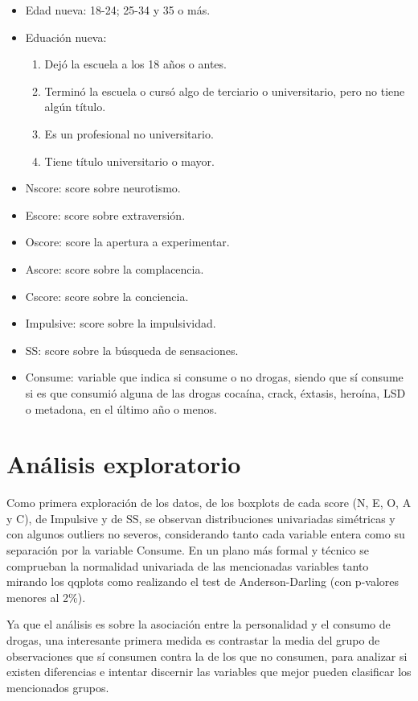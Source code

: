 \documentclass[a4paper,twocolumn]{article}
\begin{document}
\begin{itemize}
	\item Edad nueva: 18-24; 25-34 y 35 o más.
	\item Eduación nueva:
	\begin{enumerate}[label=\arabic*)]
		\item Dejó la escuela a los 18 años o antes.
		\item Terminó la escuela o cursó algo de terciario o universitario, pero no tiene algún título.
		\item Es un profesional no universitario.
		\item Tiene título universitario o mayor.
	\end{enumerate}
	\item Nscore: score sobre neurotismo.
	\item Escore: score sobre extraversión.
	\item Oscore: score la apertura a experimentar.
	\item Ascore: score sobre la complacencia.
	\item Cscore: score sobre la conciencia.
	\item Impulsive: score sobre la impulsividad.
	\item SS: score sobre la búsqueda de sensaciones.
	\item Consume: variable que indica si consume o no drogas, siendo que sí consume si es que consumió alguna de las drogas cocaína, crack, éxtasis, heroína, LSD o metadona, en el último año o menos.
\end{itemize}



\section{Análisis exploratorio}
\label{sec:analExp}
Como primera exploración de los datos, de los boxplots de cada score (N, E, O, A y C), de Impulsive y de SS, se observan distribuciones univariadas simétricas y con algunos outliers no severos, considerando tanto cada variable entera como su separación por la variable Consume. En un plano más formal y técnico se comprueban la normalidad univariada de las mencionadas variables tanto mirando los qqplots como realizando el test de Anderson-Darling (con p-valores menores al 2\%).

Ya que el análisis es sobre la asociación entre la personalidad y el consumo de drogas, una interesante primera medida es contrastar la media del grupo de observaciones que sí consumen contra la de los que no consumen, para analizar si existen diferencias e intentar discernir las variables que mejor pueden clasificar los mencionados grupos.
\end{document}
